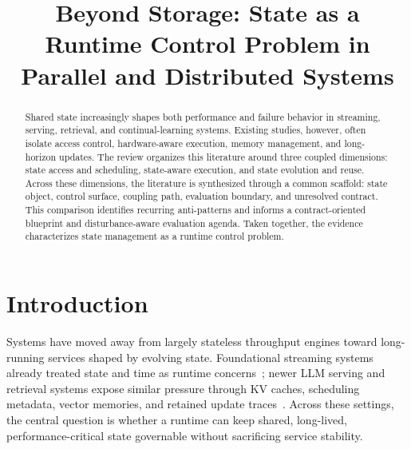 \documentclass[manuscript,nonacm]{acmart}
\begin{document}
\title{Beyond Storage: State as a Runtime Control Problem in Parallel and Distributed Systems}

\begin{abstract}
Shared state increasingly shapes both performance and failure behavior in streaming, serving, retrieval, and continual-learning systems. Existing studies, however, often isolate access control, hardware-aware execution, memory management, and long-horizon updates. The review organizes this literature around three coupled dimensions: state access and scheduling, state-aware execution, and state evolution and reuse. Across these dimensions, the literature is synthesized through a common scaffold: state object, control surface, coupling path, evaluation boundary, and unresolved contract. This comparison identifies recurring anti-patterns and informs a contract-oriented blueprint and disturbance-aware evaluation agenda. Taken together, the evidence characterizes state management as a runtime control problem.
\end{abstract}

\maketitle

\section{Introduction}

Systems have moved away from largely stateless throughput engines toward long-running services shaped by evolving state. Foundational streaming systems already treated state and time as runtime concerns~\cite{akidau2013millwheel,murray2013naiad,zaharia2013dstreams,akidau2015dataflow}; newer LLM serving and retrieval systems expose similar pressure through KV caches, scheduling metadata, vector memories, and retained update traces~\cite{kwon2023pagedattention,agrawal2024sarathi,zheng2023sglang,zhou2025ferret,zhang2026flowrag}. Across these settings, the central question is whether a runtime can keep shared, long-lived, performance-critical state governable without sacrificing service stability.
\end{document}
